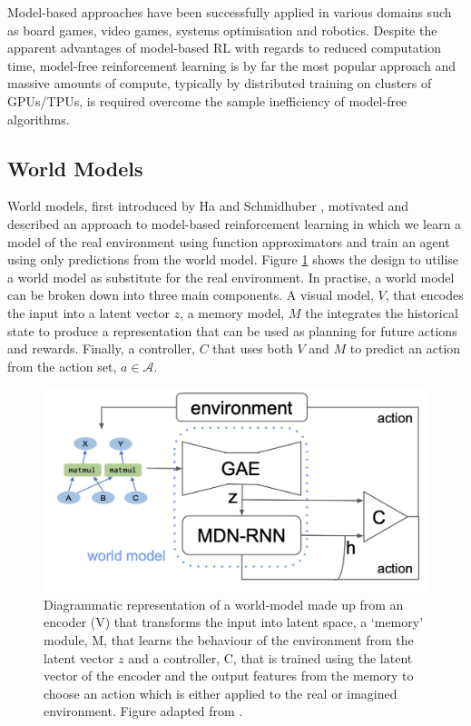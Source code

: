 Model-based approaches have been successfully applied in various domains such as board games, video games, systems optimisation and robotics. Despite the apparent advantages of model-based RL with regards to reduced computation time, model-free reinforcement learning is by far the most popular approach and massive amounts of compute, typically by distributed training on clusters of GPUs/TPUs, is required overcome the sample inefficiency of model-free algorithms.

\subsection{World Models}
World models, first introduced by Ha and Schmidhuber \cite{ha2018worldmodels}, motivated and described an approach to model-based reinforcement learning in which we learn a model of the real environment using function approximators and train an agent using only predictions from the world model. Figure \ref{fig:bg:mb-rl} shows the design to utilise a world model as substitute for the real environment. In practise, a world model can be broken down into three main components. A visual model, $V$, that encodes the input into a latent vector $z$, a memory model, $M$ the integrates the historical state to produce a representation that can be used as planning for future actions and rewards. Finally, a controller, $C$ that uses both $V$ and $M$ to predict an action from the action set, $a \in \mathcal{A}$.

\begin{figure}[ht]
  \centering
  \includegraphics[width=0.75\columnwidth]{sections/2background/images/mb-rl.png}
  \caption[Model-based Reinforcement Learning End-To-End System]{Diagrammatic representation of a world-model made up from an encoder (V) that transforms the input into latent space, a `memory' module, M, that learns the behaviour of the environment from the latent vector $z$ and a controller, C, that is trained using the latent vector of the encoder and the output features from the memory to choose an action which is either applied to the real or imagined environment. Figure adapted from \cite{ha2018worldmodels}.}
  \label{fig:bg:mb-rl}
\end{figure}

